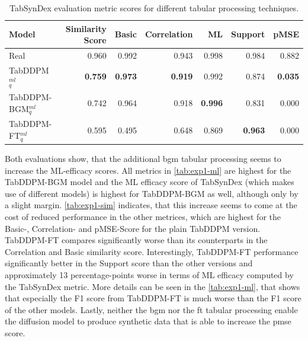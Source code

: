 \begin{table}[h]
	\centering
	\begin{tabular}{lrrrrrr}
		\toprule
		\textbf{Model}         & \textbf{Similarity Score} & \textbf{Basic} & \textbf{Correlation} & \textbf{ML}    & \textbf{Support} & \textbf{pMSE}  \\
		\midrule
		Real                   & 0.960                     & 0.992          & 0.943                & 0.998          & 0.984            & 0.882          \\
		TabDDPM$^{ml}_{q}$     & \textbf{0.759}            & \textbf{0.973} & \textbf{0.919}       & 0.992          & 0.874            & \textbf{0.035} \\
		TabDDPM-BGM$^{ml}_{q}$ & 0.742                     & 0.964          & 0.918                & \textbf{0.996} & 0.831            & 0.000          \\
		TabDDPM-FT$^{ml}_{q}$  & 0.595                     & 0.495          & 0.648                & 0.869          & \textbf{0.963}   & 0.000          \\
		\bottomrule
	\end{tabular}
	\caption[Experiment1-Similarity]{TabSynDex evaluation metric scores for different tabular processing techniques.}
	\label{tab:exp1-sim}
\end{table}

Both evaluations show, that the additional \gls{bgm} tabular processing seems to increase the ML-efficacy scores.
All metrics in \autoref{tab:exp1-ml} are highest for the TabDDPM-BGM model and the ML efficacy score of TabSynDex (which makes use of different models)
is highest for TabDDPM-BGM as well, although only by a slight margin.
\autoref{tab:exp1-sim} indicates, that this increase seems to come at the cost of reduced performance in the other metrices, which are highest for the Basic-, Correlation- and pMSE-Score for the plain TabDDPM version.
TabDDPM-FT compares significantly worse than its counterparts in the Correlation and Basic similarity score.
Interestingly, TabDDPM-FT performance significantly better in the Support score than the other versions and approximately 13 percentage-points worse in terms of ML efficacy computed by the TabSynDex metric.
More details can be seen in the \autoref{tab:exp1-ml}, that shows that especially the F1 score from TabDDPM-FT is much worse than the F1 score of the other models.
Lastly, neither the \gls{bgm} nor the \gls{ft} tabular processing enable the diffusion model to produce synthetic data that is able to increase the \gls{pmse} score.


